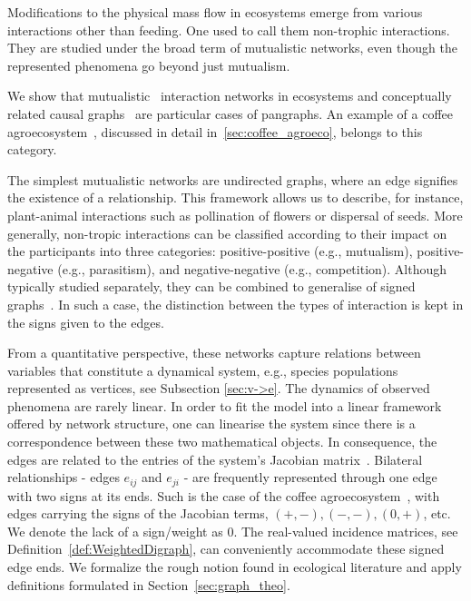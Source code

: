 \documentclass[a4paper,12pt]{article}
\theoremstyle{definition}
\theoremstyle{remark}
\begin{document}
Modifications to the physical mass
flow in ecosystems emerge from various interactions other than feeding. One used to call them non-trophic interactions. They are studied under the broad term of mutualistic networks, even though the represented phenomena go beyond just mutualism.

We show that mutualistic~\cite{Bascompte_Mutualistic_networks} interaction networks in ecosystems and conceptually related causal graphs~\cite{Pearl_2009, Morgan_Winship_2014} are particular cases of pangraphs. An example of a coffee agroecosystem~\cite{GOLUBSKI2016344}, discussed in detail in~\ref{sec:coffee_agroeco}, belongs to this category.

The simplest mutualistic networks are undirected graphs, where an edge signifies the existence of a relationship. This framework allows us to describe, for instance, plant-animal interactions such as pollination of flowers or dispersal of seeds. More generally, non-tropic interactions can be classified according to their impact on the participants into three categories: positive-positive (e.g., mutualism), positive-negative (e.g., parasitism), and negative-negative (e.g., competition). Although typically studied separately, they can be combined to generalise of signed graphs~\cite{signed_graph_1936, signed_graph_1955}. In such a case, the distinction between the types of interaction is kept in the signs given to the edges.

From a quantitative perspective, these networks capture relations between variables that constitute a dynamical system, e.g., species populations represented as vertices, see Subsection \ref{sec:v->e}. The dynamics of observed phenomena are rarely linear. In order to fit the model into a linear framework offered by network structure, one can linearise the system since there is a correspondence between these two mathematical objects. In consequence, the edges are related to the entries of the system's Jacobian matrix~\cite{HIGASHI_1995_ecological_interaction_networks, NAKAJIMA_1995_ecological_interaction_networks}. Bilateral relationships - edges $e_{ij}$ and $e_{ji}$ - are frequently represented through one edge with two signs at its ends. Such is the case of the coffee agroecosystem~\cite{GOLUBSKI2016344}, with edges carrying the signs of the Jacobian terms, $(+,-), (-,-), (0,+)$, etc. We denote the lack of a sign/weight as $0$. The real-valued incidence matrices, see Definition~\ref{def:WeightedDigraph}, can conveniently accommodate these signed edge ends. We formalize the rough notion found in ecological literature and apply definitions formulated in Section~\ref{sec:graph_theo}.
\end{document}
